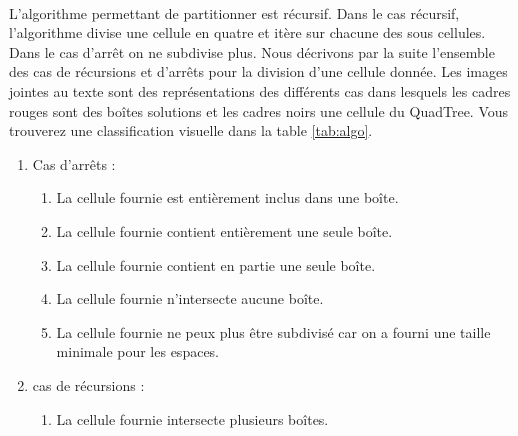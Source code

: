 \paragraph{}L'algorithme permettant de partitionner est récursif. Dans le cas récursif, l'algorithme divise une cellule en quatre et itère sur chacune des sous cellules. Dans le cas d'arrêt on ne subdivise plus. Nous décrivons par la suite l'ensemble des cas de récursions et d'arrêts pour la division d'une cellule donnée. Les images jointes au texte sont des représentations des différents cas dans lesquels les cadres rouges sont des boîtes solutions et les cadres noirs une cellule du QuadTree. Vous trouverez une classification visuelle dans la table \ref{tab:algo}.
\begin{enumerate}
\item Cas d'arrêts : 
\begin{enumerate}
\item La cellule fournie est entièrement inclus dans une boîte.
\label{enu:quad1}
\item La cellule fournie contient entièrement une seule boîte.
\label{enu:quad2}
\item La cellule fournie contient en partie une seule boîte.
\label{enu:quad3}
\item La cellule fournie n'intersecte aucune boîte.
\label{enu:quad4}
\item La cellule fournie ne peux plus être subdivisé car on a fourni une taille minimale pour les espaces.
\end{enumerate}
\item cas de récursions :
\begin{enumerate}
\item La cellule fournie intersecte plusieurs boîtes.
\label{enu:quad5}
\end{enumerate}
\end{enumerate}

